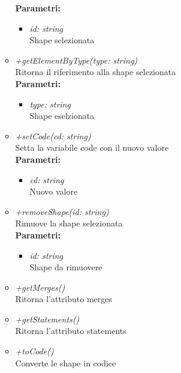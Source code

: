 \begin{itemize}
\begin{itemize}
    		\textbf{Parametri:}
    		\begin{itemize}
    			\item \emph{id: string}\\
    			Shape selezionata
    		\end{itemize}
    		\item \emph{+getElementByType(type: string)}\\
    		Ritorna il riferimento alla shape selezionata\\
    		\textbf{Parametri:}
    		\begin{itemize}
    			\item \emph{type: string}\\
    			Shape eselzionata
    		\end{itemize}
    		\item \emph{+setCode(cd: string)}\\
    		Setta la variabile code con il nuovo valore\\
    		\textbf{Parametri:}
    		\begin{itemize}
    			\item \emph{cd: string}\\
    			Nuovo valore
    		\end{itemize}
    		\item \emph{+removeShape(id: string)}\\
    		Rimuove la shape selezionata\\
    		\textbf{Parametri:}
    		\begin{itemize}
    			\item \emph{id: string}\\
    			Shape da rimuovere
    		\end{itemize}
    		\item \emph{+getMerges()}\\
    		Ritorna l'attributo merges
    		\item \emph{+getStatements()}\\
    		Ritorna l'attributo statements
    		\item \emph{+toCode()}\\
    		Converte le shape in codice
		\end{itemize}
\end{itemize}